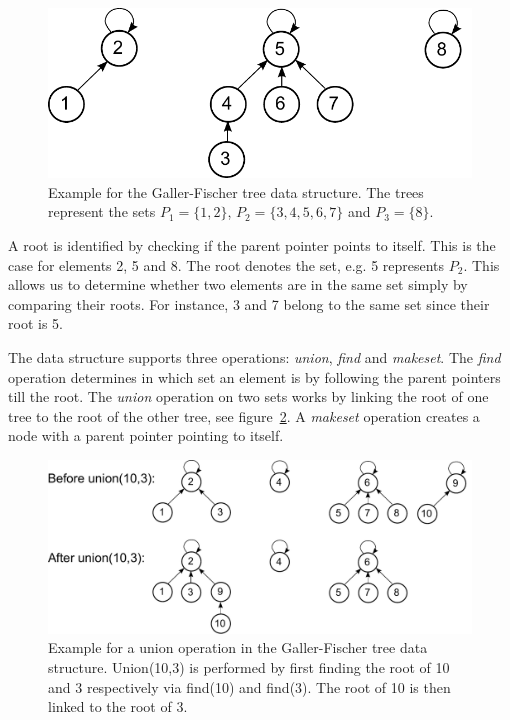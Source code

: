 \documentclass[a4paper,12pt, titlepage]{article}  %
\begin{document}
\begin{figure}[h]
	\centering
	\includegraphics[scale=0.5]{./figures/gallerFischer_example.pdf}
	\caption{Example for the Galler-Fischer tree data structure. The trees represent the sets
					$P_1=\{1,2\}$, $P_2=\{3,4,5,6,7\}$ and $P_3=\{8\}$.}
	\label{fig:gallerFischer_example}
\end{figure}

\noindent A root is identified by checking if the parent pointer points to itself. This is the 
case for elements 2, 5 and 8. The root denotes the set, e.g. 5 represents $P_2$. This allows us 
to determine whether two elements are in the same set simply by comparing their roots. For instance, 
3 and 7 belong to the same set since their root is 5. 

The data structure supports three operations: \emph{union}, \emph{find} and \emph{makeset}. 
The \emph{find} operation determines in which set an element is by following the parent pointers
till the root. The \emph{union} operation on two sets works by linking the root of one tree
to the root of the other tree, see figure~\ref{fig:gallerFischer_example1}. A \emph{makeset} operation 
creates a node with a parent pointer pointing to itself.

\begin{figure}[ht]
	\centering
	\includegraphics[scale=0.47]{./figures/gallerFischer_example1.pdf}
	\caption{Example for a union operation in the Galler-Fischer tree data structure. 
	        Union(10,3) is performed by first finding the root of 10 and 3 respectively via find(10) and
	        find(3). The root of 10 is then linked to the root of 3.}
	\label{fig:gallerFischer_example1}
\end{figure}
\end{document}

